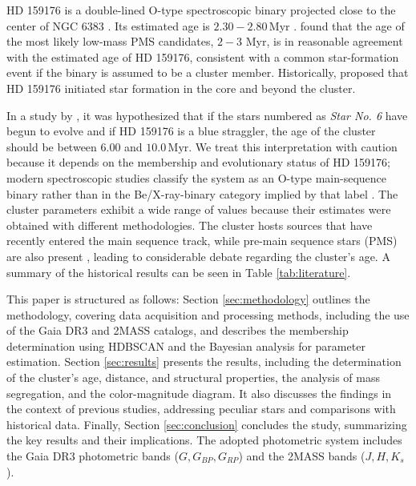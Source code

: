 \documentclass{aa}
\begin{document}
HD 159176 is a double-lined O-type spectroscopic binary projected close to the center of NGC 6383 \citep{1993Obs...113..204S,2007A&A...474..193L,2016ApJ...832..211P}. Its estimated age is $2.30-2.80$\,\textrm{Myr} \citep{2010AA...511A..25R}. \citet{2010AA...511A..25R} found that the age of the most likely low-mass PMS candidates, $2-3$ Myr, is in reasonable agreement with the estimated age of HD 159176, consistent with a common star-formation event if the binary is assumed to be a cluster member. Historically, \citet{1978MNRAS.182..607F} proposed that HD 159176 initiated star formation in the core and beyond the cluster.

In a study by \citet{2018AA...610A..30A}, it was hypothesized that if the stars numbered as \textit{Star No. 6} have begun to evolve and if HD 159176 is a blue straggler, the age of the cluster should be between $6.00$ and $10.0\,\textrm{Myr}$. We treat this interpretation with caution because it depends on the membership and evolutionary status of HD 159176; modern spectroscopic studies classify the system as an O-type main-sequence binary rather than in the Be/X-ray-binary category implied by that label \citep{1993Obs...113..204S,2007A&A...474..193L,2016ApJ...832..211P}. The cluster parameters exhibit a wide range of values because their estimates were obtained with different methodologies. The cluster hosts sources that have recently entered the main sequence track, while pre-main sequence stars (PMS) are also present \citep{2019MNRAS.484.5102K}, leading to considerable debate regarding the cluster's age. A summary of the historical results can be seen in Table \ref{tab:literature}.

This paper is structured as follows: Section \ref{sec:methodology} outlines the methodology, covering data acquisition and processing methods, including the use of the Gaia DR3 and 2MASS catalogs, and describes the membership determination using HDBSCAN and the Bayesian analysis for parameter estimation. Section \ref{sec:results} presents the results, including the determination of the cluster's age, distance, and structural properties, the analysis of mass segregation, and the color-magnitude diagram. It also discusses the findings in the context of previous studies, addressing peculiar stars and comparisons with historical data. Finally, Section \ref{sec:conclusion} concludes the study, summarizing the key results and their implications. The adopted photometric system includes the Gaia DR3 photometric bands ($G, G_{BP}, G_{RP}$) and the 2MASS bands ($J, H, K_s$).
\end{document}

